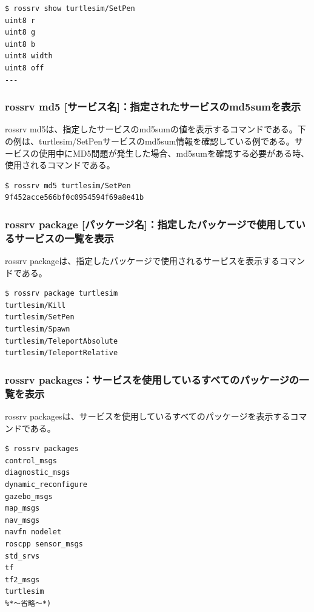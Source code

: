 \begin{lstlisting}[language=ROS]
$ rossrv show turtlesim/SetPen
uint8 r
uint8 g
uint8 b
uint8 width
uint8 off
---
\end{lstlisting}

\subsubsection{rossrv md5 [サービス名]：指定されたサービスのmd5sumを表示}

rossrv md5は、指定したサービスのmd5sumの値を表示するコマンドである。下の例は、turtlesim/SetPenサービスのmd5sum情報を確認している例である。サービスの使用中にMD5問題が発生した場合、md5sumを確認する必要がある時、使用されるコマンドである。

\begin{lstlisting}[language=ROS]
$ rossrv md5 turtlesim/SetPen
9f452acce566bf0c0954594f69a8e41b
\end{lstlisting}

\subsubsection{rossrv package [パッケージ名]：指定したパッケージで使用しているサービスの一覧を表示}

rossrv packageは、指定したパッケージで使用されるサービスを表示するコマンドである。

\begin{lstlisting}[language=ROS]
$ rossrv package turtlesim
turtlesim/Kill
turtlesim/SetPen
turtlesim/Spawn
turtlesim/TeleportAbsolute
turtlesim/TeleportRelative
\end{lstlisting}

\subsubsection{rossrv packages：サービスを使用しているすべてのパッケージの一覧を表示}

rossrv packagesは、サービスを使用しているすべてのパッケージを表示するコマンドである。

\begin{lstlisting}[language=ROS]
$ rossrv packages
control_msgs
diagnostic_msgs
dynamic_reconfigure
gazebo_msgs
map_msgs
nav_msgs
navfn nodelet
roscpp sensor_msgs
std_srvs
tf
tf2_msgs
turtlesim
%*〜省略〜*)
\end{lstlisting}

